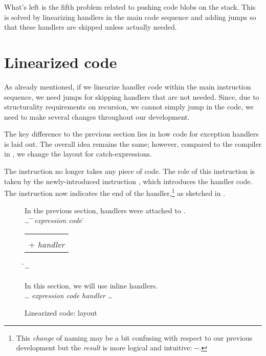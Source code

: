 What's left is the fifth problem related to pushing code blobs on the stack.
This is solved by linearizing handlers in the main code sequence and adding
jumps so that these handlers are skipped unless actually needed.

\newpage
\section{Linearized code}
\label{sec:linearized-code}

As already mentioned, if we linearize handler code within the main instruction
sequence, we need jumps for skipping handlers that are not needed.  Since, due
to structurality requirements on recursion, we cannot simply jump in the code,
we need to make several changes throughout our development.

\label{sec:linearized-code-layout}The key difference to the previous section
lies in how code for exception handlers is laid out. The overall idea remains
the same; however, compared to the compiler in , we
change the layout for catch-expressions.

The instruction  no longer takes any piece of code.
The role of this instruction is taken by the newly-introduced instruction
, which introduces the handler code.  The instruction
 now indicates the end of the handler,\footnote{This \emph{change}
of naming may be a bit confusing with respect to our previous development but
the \emph{result} is more logical and intuitive:
--.} as sketched in
.

\begin{figure}[htp]
\small
\begin{center}
\begin{minipage}{0.9\textwidth}\begin{tabbing}
In the previous section, handlers were attached to .\\
\quad \ldots
	\= \quad {}
	\= \quad \textit{expression code}
	\= \quad \begin{tabular}{c}\ident{UNMARK} \\ + \textit{handler}\end{tabular}
	\= \quad \ldots \\\\
In this section, we will use inline handlers. \\
\quad \ldots
	\> \quad {}
	\> \quad \textit{expression code}
	\> \quad \hspace{5pt} 
	\> \quad \textit{handler}
		\quad {}
		\quad \ldots 
\end{tabbing}\end{minipage}
\end{center}
\caption{Linearized code: layout}
\label{fig:linearized-code}
\end{figure}

